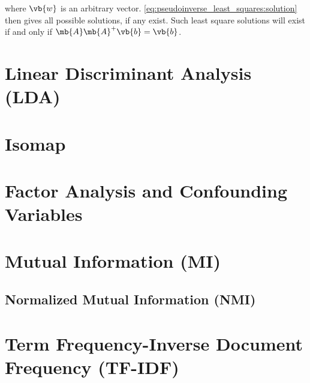 \noindent where $\vb{w}$ is an arbitrary vector.
\cref{eq:pseudoinverse_least_squares:solution} then gives all possible solutions, if any exist.
Such least square solutions will exist if and only if $\mb{A} \mb{A}^{+} \vb{b} = \vb{b}$.

\section{Linear Discriminant Analysis (LDA)}
\label{dim_reduct:LDA}


\section{Isomap}
\label{dim_reduct:isomap}

\section{Factor Analysis and Confounding Variables}
\label{dim_reduct:factor_ana}

\section{Mutual Information (MI)}
\label{dim_reduct:MI}

\subsection{Normalized Mutual Information (NMI)}
\label{dim_reduct:MI:normalized}

\section{Term Frequency-Inverse Document Frequency (TF-IDF)}
\label{dim_reduct:tfidf}

